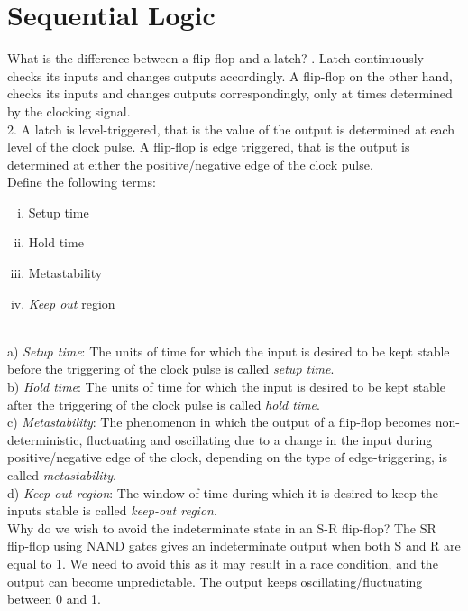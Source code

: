 \section*{Sequential Logic}

\begin{ExerciseList}
\Exercise
What is the difference between a flip-flop and a latch?
. Latch continuously checks its inputs and changes outputs accordingly. A flip-flop on the other hand, checks its inputs and changes outputs correspondingly, only at times determined by the clocking signal.\\
2. A latch is level-triggered, that is the value of the output is determined at each level of the clock pulse. A flip-flop is edge triggered, that is the output is determined at either the positive/negative edge of the clock pulse. \\
\Exercise
Define the following terms:
\begin{enumerate}[i)]
\item Setup time
\item Hold time
\item Metastability
\item {\em Keep out} region
\end{enumerate}
\Answer 
\hspace{3mm} \\
a) \textit{Setup time}: The units of time for which the input is desired to be kept stable before the triggering of the clock pulse is called \textit{setup time}. \\
b) \textit{Hold time}: The units of time for which the input is desired to be kept stable after the triggering of the clock pulse is called \textit{hold time}. \\
c) \textit{Metastability}: The phenomenon in which the output of a flip-flop becomes non-deterministic, fluctuating and oscillating due to a change in the input during positive/negative edge of the clock, depending on the type of edge-triggering, is called \textit{metastability}. \\
d) \textit{Keep-out region}: The window of time during which it is desired to keep the inputs stable is called \textit{keep-out region}. \\
\Exercise
Why do we wish to avoid the indeterminate state in an S-R flip-flop?
\Answer
The SR flip-flop using NAND gates gives an indeterminate output when both S and R are equal to 1. We need to avoid this as it may result in a race condition, and the output can become unpredictable. The output keeps oscillating/fluctuating between 0 and 1. 

\end{ExerciseList}
